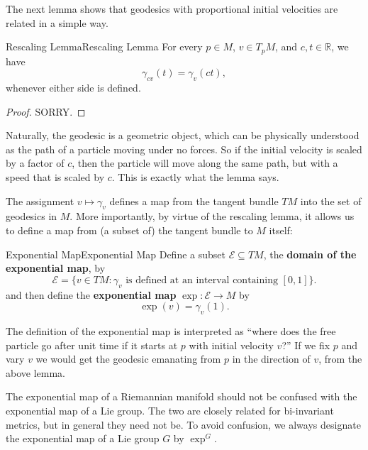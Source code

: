 \documentclass[../main.tex]{subfiles}
\begin{document}
The next lemma shows that geodesics with proportional initial velocities are related in a simple way.
\begin{lemma}{Rescaling Lemma}{Rescaling Lemma}
	For every $p \in M$, $v \in T_p M$, and $c,t \in \mathbb{R}$, we have
	\begin{equation}
		\gamma_{cv}(t) = \gamma_v(ct),
	\end{equation}
	whenever either side is defined.
\end{lemma}
\begin{proof}
	SORRY.
\end{proof}

\begin{remark}
	Naturally, the geodesic is a geometric object, which can be physically understood as the path of a particle moving under no forces. So if the initial velocity is scaled by a factor of $c$, then the particle will move along the same path, but with a speed that is scaled by $c$. This is exactly what the lemma says.
\end{remark}

The assignment $v \mapsto \gamma_v$ defines a map from the tangent bundle $TM$ into the set of geodesics in $M$. More importantly, by virtue of the rescaling lemma, it allows us to define a map from (a subset of) the tangent bundle to $M$ itself:

\begin{definition}{Exponential Map}{Exponential Map}
	Define a subset $\mathcal{E} \subseteq TM$, the \textbf{domain of the exponential map}, by
	\begin{equation}
		\mathcal{E} = \{ v \in TM : \gamma_v \text{ is defined at an interval containing } [0,1] \}.
	\end{equation}
	and then define the \textbf{exponential map} $\exp: \mathcal{E} \to M$ by
	\begin{equation}
		\exp(v) = \gamma_v(1).
	\end{equation}
\end{definition}
The definition of the exponential map is interpreted as ``where does the free particle go after unit time if it starts at $p$ with initial velocity $v$?'' If we fix $p$ and vary $v$ we would get the geodesic emanating from $p$ in the direction of $v$, from the above lemma.

\begin{remark}
	The exponential map of a Riemannian manifold should not be confused with the exponential map of a Lie group. The two are closely related for bi-invariant metrics, but in general they need not be. To avoid confusion, we always designate the exponential map of a Lie group $G$ by $\exp^G$.
\end{remark}
\end{document}

